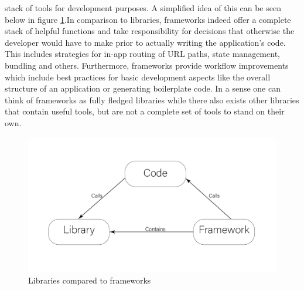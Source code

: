 \documentclass[11pt]{article}
\begin{document}
stack of tools for development purposes. A simplified idea of this can be seen below in figure \ref{fig:1}.In comparison to libraries, 
frameworks indeed offer a complete stack of helpful functions and take responsibility for decisions that otherwise the developer
would have to make prior to actually writing the application’s code. This includes strategies for in-app routing of URL paths, 
state management, bundling and others. Furthermore, frameworks provide workflow improvements which include best practices
for basic development aspects like the overall structure of an application or generating boilerplate code. In a sense one can think of
frameworks as fully fledged libraries while there also exists other libraries that contain useful tools, but are not a complete 
set of tools to stand on their own. 

\begin{figure}[h]
    \centering
    \includegraphics{flowchart}
    \caption{Libraries compared to frameworks}
    \label{fig:1}
\end{figure}
\end{document}

